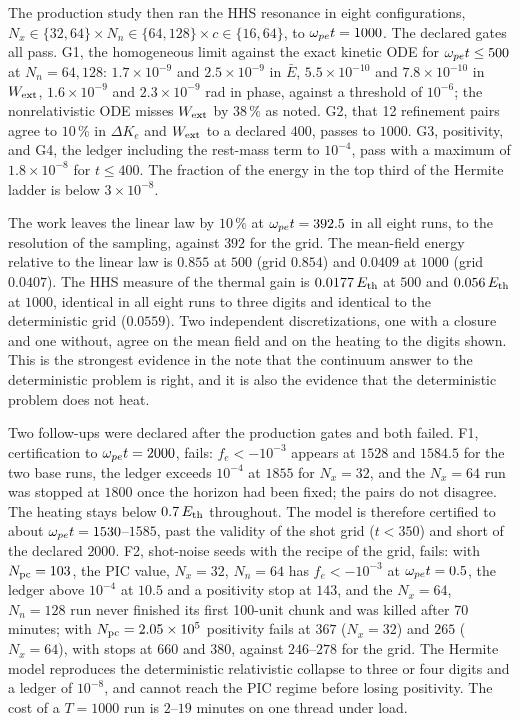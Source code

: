 The production study then ran the HHS resonance in eight configurations, $N_x\in\{32,64\}\times N_n\in\{64,128\}\times c\in\{16,64\}$, to $\omega_{pe} t=1000$. The declared gates all pass. G1, the homogeneous limit against the exact kinetic ODE for $\omega_{pe} t\le500$ at $N_n=64,128$: $1.7\times10^{-9}$ and $2.5\times10^{-9}$ in $\bar E$, $5.5\times10^{-10}$ and $7.8\times10^{-10}$ in $W_{\rm ext}$, $1.6\times10^{-9}$ and $2.3\times10^{-9}$ rad in phase, against a threshold of $10^{-6}$; the nonrelativistic ODE misses $W_{\rm ext}$ by $38\,\%$ as noted. G2, that 12 refinement pairs agree to $10\,\%$ in $\Delta K_e$ and $W_{\rm ext}$ to a declared $400$, passes to $1000$. G3, positivity, and G4, the ledger including the rest-mass term to $10^{-4}$, pass with a maximum of $1.8\times10^{-8}$ for $t\le400$. The fraction of the energy in the top third of the Hermite ladder is below $3\times10^{-8}$.


The work leaves the linear law by $10\,\%$ at $\omega_{pe} t=392.5$ in all eight runs, to the resolution of the sampling, against $392$ for the grid. The mean-field energy relative to the linear law is $0.855$ at $500$ (grid $0.854$) and $0.0409$ at $1000$ (grid $0.0407$). The HHS measure of the thermal gain is $0.0177\,E_{\rm th}$ at $500$ and $0.056\,E_{\rm th}$ at $1000$, identical in all eight runs to three digits and identical to the deterministic grid ($0.0559$). Two independent discretizations, one with a closure and one without, agree on the mean field and on the heating to the digits shown. This is the strongest evidence in the note that the continuum answer to the deterministic problem is right, and it is also the evidence that the deterministic problem does not heat.

Two follow-ups were declared after the production gates and both failed. F1, certification to $\omega_{pe} t=2000$, fails: $f_e<-10^{-3}$ appears at $1528$ and $1584.5$ for the two base runs, the ledger exceeds $10^{-4}$ at $1855$ for $N_x=32$, and the $N_x=64$ run was stopped at $1800$ once the horizon had been fixed; the pairs do not disagree. The heating stays below $0.7\,E_{\rm th}$ throughout. The model is therefore certified to about $\omega_{pe} t=1530$--$1585$, past the validity of the shot grid ($t<350$) and short of the declared $2000$. F2, shot-noise seeds with the recipe of the grid, fails: with $N_{\rm pc}=103$, the PIC value, $N_x=32$, $N_n=64$ has $f_e<-10^{-3}$ at $\omega_{pe} t=0.5$, the ledger above $10^{-4}$ at $10.5$ and a positivity stop at $143$, and the $N_x=64$, $N_n=128$ run never finished its first 100-unit chunk and was killed after 70 minutes; with $N_{\rm pc}=2.05\times10^{5}$ positivity fails at $367$ ($N_x=32$) and $265$ ($N_x=64$), with stops at $660$ and $380$, against $246$--$278$ for the grid. The Hermite model reproduces the deterministic relativistic collapse to three or four digits and a ledger of $10^{-8}$, and cannot reach the PIC regime before losing positivity. The cost of a $T=1000$ run is $2$--$19$ minutes on one thread under load.

